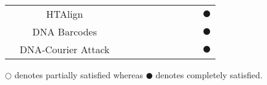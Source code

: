 \documentclass{bioinfo}
\begin{document}
\begin{table*}[t]
{\begin{tabular}{|c|c|c|c|c|c|c|c|c|c|c|}
		&HTAlign~\cite{HB2011IEEEICOBAB}  &  &  &\centering{$\CIRCLE$}  &  &\centering{$\Circle$}  &\centering{$\Circle$}  &  &  &$\CIRCLE$\\ \cline{2-11}
		&DNA Barcodes~\cite{KS2015BMCB}  &\centering{$\CIRCLE$}  &  &\centering{$\CIRCLE$}  &  &\centering{$\CIRCLE$}  &\centering{$\CIRCLE$}  &  &  &$\CIRCLE$\\ \cline{2-11}
		&DNA-Courier Attack~\cite{CLY2015SAPW}  &  &  &\centering{$\CIRCLE$}  &\centering{$\CIRCLE$}  &  &  &  &\centering{$\CIRCLE$}  &$\CIRCLE$\\ \hline
	\end{tabular}}
    \fontsize{7pt}{12pt}\selectfont
    \raggedright $\Circle$ denotes partially satisfied whereas $\CIRCLE$ denotes completely satisfied.
\end{table*}
\end{document}
